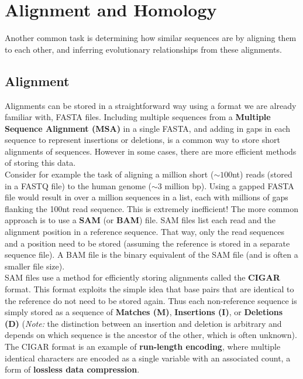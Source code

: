 \documentclass[12pt]{article}
\begin{document}
\section{Alignment and Homology}
Another common task is determining how similar sequences are by aligning them to each other, and inferring evolutionary relationships from these alignments.
\subsection{Alignment}
Alignments can be stored in a straightforward way using a format we are already familiar with, FASTA files. Including multiple sequences from a {\bf Multiple Sequence Alignment (MSA)} in a single FASTA, and adding in gaps in each sequence to represent insertions or deletions, is a common way to store short alignments of sequences. However in some cases, there are more efficient methods of storing this data. \\[10pt]
Consider for example the task of aligning a million short ($\sim100$nt) reads (stored in a FASTQ file) to the human genome ($\sim3$ million bp). Using a gapped FASTA file would result in over a million sequences in a list, each with millions of gaps flanking the 100nt read sequence. This is extremely inefficient! The more common approach is to use a {\bf SAM} (or \textbf{BAM}) file. SAM files list each read and the alignment position in a reference sequence. That way, only the read sequences and a position need to be stored (assuming the reference is stored in a separate sequence file). A BAM file is the binary equivalent of the SAM file (and is often a smaller file size).\\[10pt]
SAM files use a method for efficiently storing alignments called the {\bf CIGAR} format. This format exploits the simple idea that base pairs that are identical to the reference do not need to be stored again. Thus each non-reference sequence is simply stored as a sequence of {\bf Matches (M)}, {\bf Insertions (I)}, or {\bf Deletions (D)} ({\it Note:} the distinction between an insertion and deletion is arbitrary and depends on which sequence is the ancestor of the other, which is often unknown). The CIGAR format is an example of \textbf{run-length encoding}, where multiple identical characters are encoded as a single variable with an associated count, a form of \textbf{lossless data compression}.
\end{document}
